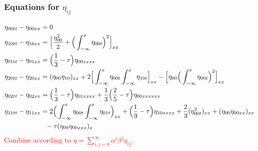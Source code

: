 \documentclass[9pt, english]{beamer}
\theoremstyle{definition}
\newcommand{\red}[1]{\textcolor{red}{#1}}
\begin{document}
\begin{frame}
  \frametitle{Equations for $\eta_{ij}$}
{\small\begin{equation*}\begin{aligned}
\eta_{00tt} - \eta_{00xx} &= 0\\
\eta_{10tt} - \eta_{10xx} &= \Big[\frac{\eta_{00}^2}{2} +
\Big(\int_{-\infty}^x\eta_{00t}\Big)^2\Big]_{xx}\\
\eta_{01tt} - \eta_{01xx} &= \Big(\frac{1}{3}-\tau\Big)\eta_{00xxxx}\\
\eta_{20tt} - \eta_{20xx} &= (\eta_{00}\eta_{10})_{xx} + 2
\Big[\int_{-\infty}^x\eta_{00t}\int_{-\infty}^x\eta_{10t}\Big]_{xx}
-
\Big[\eta_{00}\Big(\int_{-\infty}^x\eta_{00t}\Big)^2\Big]_{xx}\\
\eta_{02tt} - \eta_{02xx} &= \Big(\frac{1}{3}-\tau\Big)\eta_{01xxxx}
+
\frac{1}{3}\Big(\frac{2}{5}-\tau\Big)\eta_{00xxxxxx}\\
\eta_{11tt} - \eta_{11xx} &=
2\Big(\int_{-\infty}^x\eta_{00t}\int_{-\infty}^x\eta_{01t}\Big)_{xx}
+
\Big(\frac{1}{3}-\tau\Big)\eta_{10xxxx} + \frac{2}{3}(\eta_{00t}^2)_{xx} + (\eta_{00}\eta_{00xx})_{xx}\\
& \hspace{0.25cm}- \tau(\eta_{00}\eta_{00xxx})_x
\end{aligned}\end{equation*}}
\red{Combine according to $\eta=\sum_{i,j=0}^\infty
\alpha^i\beta^j\eta_{ij}$.}
\end{frame}
\end{document}
